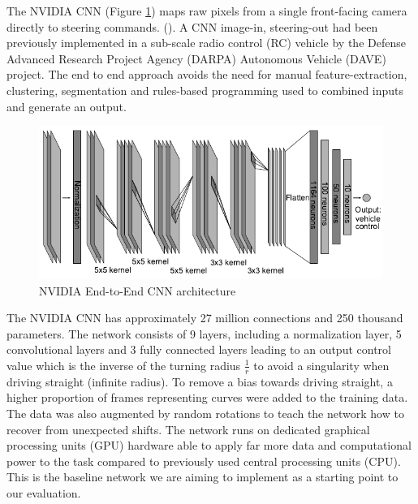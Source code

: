 The NVIDIA CNN (Figure \ref{fig:nvidia_cnn}) maps raw pixels from a single front-facing camera directly to steering commands. (\cite{journals/corr/BojarskiTDFFGJM16}). A CNN image-in, steering-out had been previously implemented in a sub-scale radio control (RC) vehicle by the Defense Advanced Research Project Agency (DARPA) Autonomous Vehicle (DAVE) project. The end to end approach avoids the need for manual feature-extraction, clustering, segmentation and rules-based programming used to combined inputs and generate an output.


\begin{figure}[ht]
 \centering 
 \includegraphics[width=\columnwidth]{figures/nvidia-end-to-end-horizontal.png}
 \caption{NVIDIA End-to-End CNN architecture}
 \label{fig:nvidia_cnn}
\end{figure}

The NVIDIA CNN has approximately 27 million connections and 250 thousand parameters. The network consists of 9 layers, including a normalization layer, 5 convolutional layers and 3 fully connected layers leading to an output control value which is the inverse of the turning radius $\frac{1}{r}$ to avoid a singularity when driving straight (infinite radius).
To remove a bias towards driving straight, a higher proportion of frames representing curves were added to the training data. The data was also augmented by random rotations to teach the network how to recover from unexpected shifts.
The network runs on dedicated graphical processing units (GPU) hardware able to apply far more data and computational power to the task compared to previously used central processing units (CPU).
This is the baseline network we are aiming to implement as a starting point to our evaluation.




